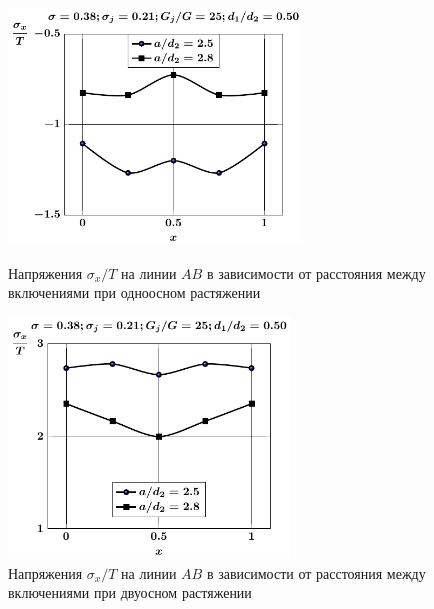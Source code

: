 \begin{russian}
\begin{figure}[h!]
\centering\footnotesize
\parbox[b]{7.5cm}{\centering\includegraphics[width=7.8cm]{oblate-inc8-a-d50-g25-t1-sig_x.pdf}
\caption{Напряжения $\sigma_x/T$ на линии $AB$ в зависимости от расстояния между включениями при одноосном растяжении
\label{f:10:14}}}\hfil\hfil
\parbox[b]{7.5cm}{\centering\includegraphics[width=7.5cm]{oblate-inc8-a-d50-g25-t2-sig_x.pdf}
\caption{Напряжения $\sigma_x/T$ на линии $AB$ в зависимости от расстояния между включениями при двуосном растяжении
\label{f:10:15}}}
\end{figure}


\end{russian}
